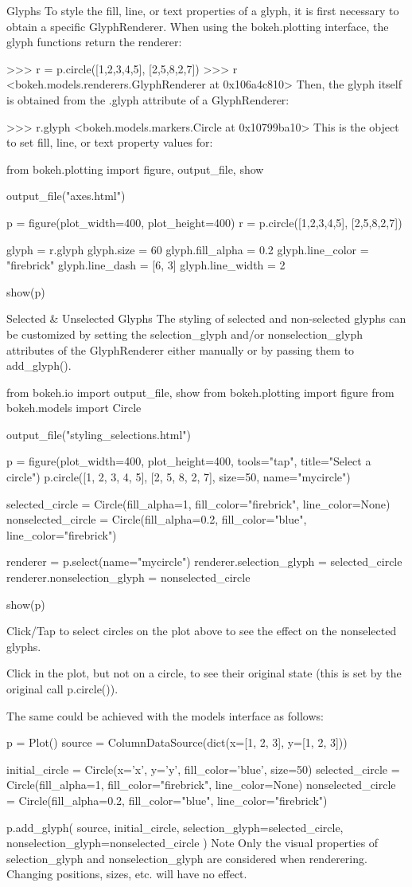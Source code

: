 Glyphs
To style the fill, line, or text properties of a glyph, it is first necessary to obtain a specific GlyphRenderer. When using the bokeh.plotting interface, the glyph functions return the renderer:

>>> r = p.circle([1,2,3,4,5], [2,5,8,2,7])
>>> r
<bokeh.models.renderers.GlyphRenderer at 0x106a4c810>
Then, the glyph itself is obtained from the .glyph attribute of a GlyphRenderer:

>>> r.glyph
<bokeh.models.markers.Circle at 0x10799ba10>
This is the object to set fill, line, or text property values for:

from bokeh.plotting import figure, output_file, show

output_file("axes.html")

p = figure(plot_width=400, plot_height=400)
r = p.circle([1,2,3,4,5], [2,5,8,2,7])

glyph = r.glyph
glyph.size = 60
glyph.fill_alpha = 0.2
glyph.line_color = "firebrick"
glyph.line_dash = [6, 3]
glyph.line_width = 2

show(p)
	
Selected & Unselected Glyphs
The styling of selected and non-selected glyphs can be customized by setting the selection_glyph and/or nonselection_glyph attributes of the GlyphRenderer either manually or by passing them to add_glyph().

from bokeh.io import output_file, show
from bokeh.plotting import figure
from bokeh.models import Circle

output_file("styling_selections.html")

p = figure(plot_width=400, plot_height=400, tools="tap", title="Select a circle")
p.circle([1, 2, 3, 4, 5], [2, 5, 8, 2, 7], size=50, name="mycircle")

selected_circle = Circle(fill_alpha=1, fill_color="firebrick", line_color=None)
nonselected_circle = Circle(fill_alpha=0.2, fill_color="blue", line_color="firebrick")

renderer = p.select(name="mycircle")
renderer.selection_glyph = selected_circle
renderer.nonselection_glyph = nonselected_circle

show(p)
	
Click/Tap to select circles on the plot above to see the effect on the nonselected glyphs.

Click in the plot, but not on a circle, to see their original state (this is set by the original call p.circle()).

The same could be achieved with the models interface as follows:

p = Plot()
source = ColumnDataSource(dict(x=[1, 2, 3], y=[1, 2, 3]))

initial_circle = Circle(x='x', y='y', fill_color='blue', size=50)
selected_circle = Circle(fill_alpha=1, fill_color="firebrick", line_color=None)
nonselected_circle = Circle(fill_alpha=0.2, fill_color="blue", line_color="firebrick")

p.add_glyph(
  source,
  initial_circle,
  selection_glyph=selected_circle,
  nonselection_glyph=nonselected_circle
)
Note
Only the visual properties of selection_glyph and nonselection_glyph are considered when renderering. Changing positions, sizes, etc. will have no effect.
